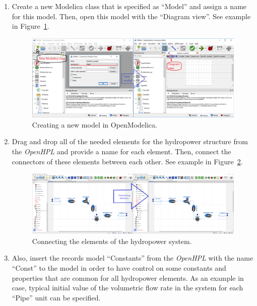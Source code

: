 \documentclass[%
]{USN-PhD}
\begin{document}
\begin{enumerate}
    \item Create a new Modelica class that is specified as ``Model'' and assign a name for this model. Then, open this model with the ``Diagram view''. See example in Figure~\ref{fig:fig16}.
    \begin{figure}[ht]
    \begin{center}
    \includegraphics[width=1\textwidth]{fig/Exam_1} %
    \caption{Creating a new model in OpenModelica.}
    \label{fig:fig16}
    \end{center}
    \end{figure}
    \item Drag and drop all of the needed elements for the hydropower structure from the \emph{OpenHPL} and provide a name for each element. Then, connect the connectors of these elements between each other. See example in Figure~\ref{fig:fig17}.
    \begin{figure}
    \begin{center}
    \includegraphics[width=1\textwidth]{fig/Exam_2} %
    \caption{Connecting the elements of the hydropower system.}
    \label{fig:fig17}
    \end{center}
    \end{figure}
    \item Also, insert the records model ``Constants'' from the \emph{OpenHPL} with the name ``Const'' to the model in order to have control on some constants and properties that are common for all hydropower elements. As an example in case, typical initial value of the volumetric flow rate in the system for each ``Pipe'' unit can be specified.

\end{enumerate}
\end{document}
